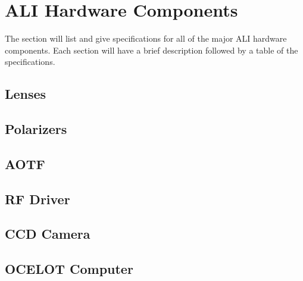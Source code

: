 \chapter{ALI Hardware Components}

The section will list and give specifications for all of the major ALI hardware components. Each section will have a brief description followed by a table of the specifications.

\section{Lenses}

\section{Polarizers}

\section{AOTF}

\section{RF Driver}

\section{CCD Camera}

\section{OCELOT Computer}


